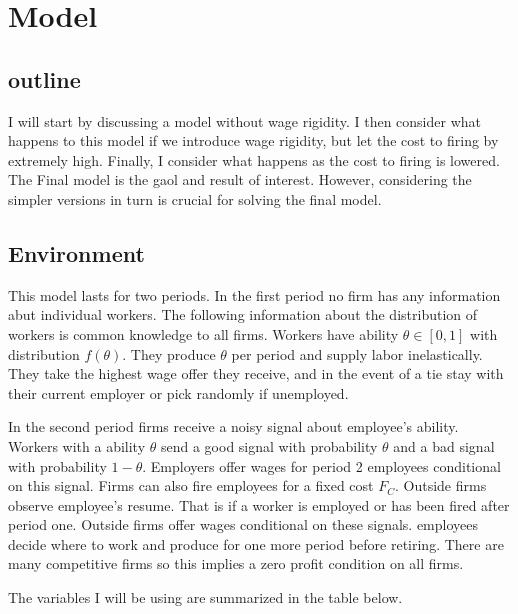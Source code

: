 \documentclass[11pt]{article}
\begin{document}
	\section{Model}
	\subsection{outline}
	
	I will start by discussing a model without wage rigidity. I then consider what happens to this model if we introduce wage rigidity, but let the cost to firing by extremely high. Finally, I consider what happens as the cost to firing is lowered. The Final model is the gaol and result of interest. However, considering the simpler versions in turn is crucial for solving the final model. 
	\subsection{Environment}
	
	This model lasts for two periods. In the first period no firm has any information abut individual workers. The following information about the distribution of workers is common knowledge to all firms. Workers have ability $\theta \in [0,1]$ with distribution $f(\theta)$. They produce $\theta$ per period and supply labor inelastically. They take the highest wage offer they receive, and in the event of a tie stay with their current employer or pick randomly if unemployed. \par
	
	In the second period firms receive a noisy signal about employee's ability. Workers with a ability $\theta$ send a good signal with probability $\theta$ and a bad signal with probability $1-\theta$. Employers offer wages for period 2 employees conditional on this signal. Firms can also fire employees for a fixed cost $F_C$. Outside firms observe employee's resume. That is if a worker is employed or has been fired after period one. Outside firms offer wages conditional on these signals. employees decide where to work and produce for one more period before retiring. There are many competitive firms so this implies a zero profit condition on all firms. \par 
	
	The variables I will be using are summarized in the table below. 
	
\end{document}
